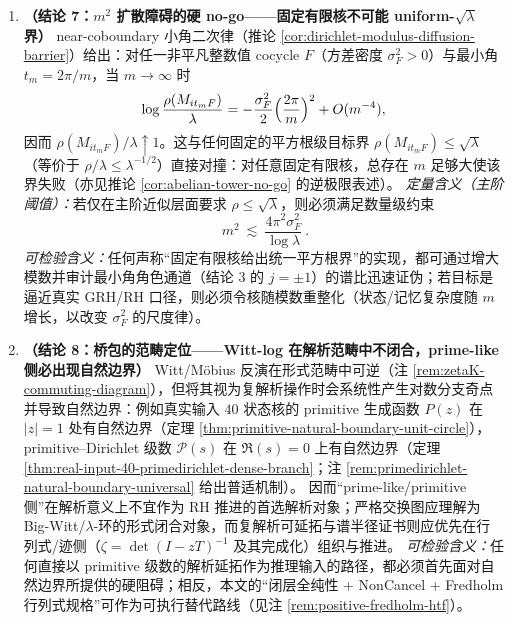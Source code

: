 \begin{enumerate}
  \item \textbf{（结论 7：\texorpdfstring{$m^2$}{m^2} 扩散障碍的硬 no-go——固定有限核不可能 uniform-\texorpdfstring{$\sqrt{\lambda}$}{sqrt(lambda)} 界）}
  near-coboundary 小角二次律（推论 \ref{cor:dirichlet-modulus-diffusion-barrier}）给出：对任一非平凡整数值 cocycle \(F\)（方差密度 \(\sigma_F^2>0\)）与最小角 \(t_m=2\pi/m\)，当 \(m\to\infty\) 时
  \[
  \log\frac{\rho(M_{it_mF})}{\lambda}
  =-\frac{\sigma_F^2}{2}\Bigl(\frac{2\pi}{m}\Bigr)^2+O(m^{-4}),
  \]
  因而 \(\rho(M_{it_mF})/\lambda\uparrow 1\)。这与任何固定的平方根级目标界
  \(
  \rho(M_{it_mF})\le \sqrt{\lambda}
  \)
  （等价于 \(\rho/\lambda\le \lambda^{-1/2}\)）直接对撞：对任意固定有限核，总存在 \(m\) 足够大使该界失败（亦见推论 \ref{cor:abelian-tower-no-go} 的逆极限表述）。
  \emph{定量含义（主阶阈值）：}若仅在主阶近似层面要求 \(\rho\le\sqrt{\lambda}\)，则必须满足数量级约束
  \[
  \boxed{\ m^2\ \lesssim\ \frac{4\pi^2\sigma_F^2}{\log\lambda}\ }.
  \]
  \emph{可检验含义：}任何声称“固定有限核给出统一平方根界”的实现，都可通过增大模数并审计最小角角色通道（结论 3 的 \(j=\pm 1\)）的谱比迅速证伪；若目标是逼近真实 GRH/RH 口径，则必须令核随模数重整化（状态/记忆复杂度随 \(m\) 增长，以改变 \(\sigma_F^2\) 的尺度律）。

  \item \textbf{（结论 8：桥包的范畴定位——Witt-log 在解析范畴中不闭合，prime-like 侧必出现自然边界）}
  Witt/Möbius 反演在形式范畴中可逆（注 \ref{rem:zetaK-commuting-diagram}），但将其视为复解析操作时会系统性产生对数分支奇点并导致自然边界：例如真实输入 \(40\) 状态核的 primitive 生成函数 \(P(z)\) 在 \(|z|=1\) 处有自然边界（定理 \ref{thm:primitive-natural-boundary-unit-circle}），primitive--Dirichlet 级数 \(\mathcal{P}(s)\) 在 \(\Re(s)=0\) 上有自然边界（定理 \ref{thm:real-input-40-primedirichlet-dense-branch}；注 \ref{rem:primedirichlet-natural-boundary-universal} 给出普适机制）。
  因而“prime-like/primitive 侧”在解析意义上不宜作为 RH 推进的首选解析对象；严格交换图应理解为 Big-Witt/\(\lambda\)-环的形式闭合对象，而复解析可延拓与谱半径证书则应优先在行列式/迹侧（\(\zeta=\det(I-zT)^{-1}\) 及其完成化）组织与推进。
  \emph{可检验含义：}任何直接以 primitive 级数的解析延拓作为推理输入的路径，都必须首先面对自然边界所提供的硬阻碍；相反，本文的“闭层全纯性 + NonCancel + Fredholm 行列式规格”可作为可执行替代路线（见注 \ref{rem:positive-fredholm-htf}）。


\end{enumerate}
